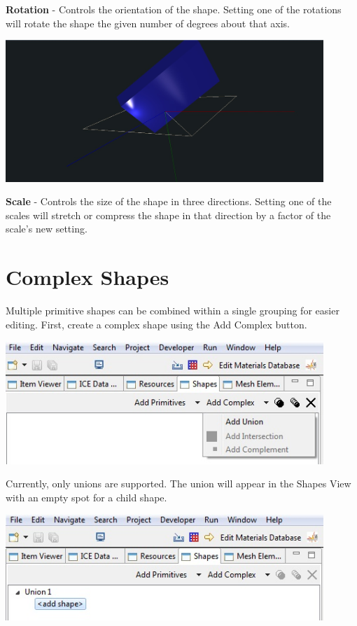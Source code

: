 \textbf{Rotation} - Controls the orientation of the shape. Setting one of the
rotations will rotate the shape the given number of degrees about that axis.

\begin{center}
\includegraphics[width=12cm]{images/GeometryCubeScale.jpg}
\end{center}

\textbf{Scale} - Controls the size of the shape in three directions. Setting one
of the scales will stretch or compress the shape in that direction by a factor
of the scale's new setting.

\section{Complex Shapes}

Multiple primitive shapes can be combined within a single grouping for easier
editing. First, create a complex shape using the Add Complex button. 

\begin{center}
\includegraphics[width=12cm]{images/GeometryAddComplex.jpg}
\end{center}

Currently, only unions are supported. The union will appear in the Shapes View
with an empty spot for a child shape. 

\begin{center}
\includegraphics[width=12cm]{images/GeometryUnionAddShape.jpg}
\end{center}

